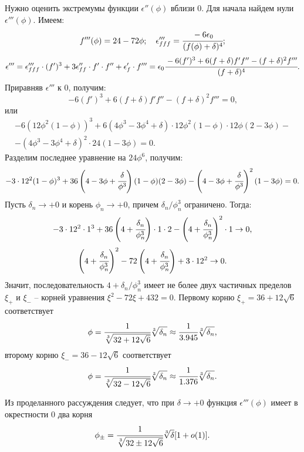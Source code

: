 \documentclass[a4paper,12pt]{article}
\theoremstyle{plain}
\theoremstyle{definition}
\begin{document}
Нужно оценить экстремумы функции $\epsilon''(\phi)$ вблизи $0$. Для начала найдем нули $\epsilon'''(\phi)$. Имеем:
$$f'''(\phi) = 24 - 72 \phi; \quad \epsilon'''_{fff} = \cfrac{-6 \epsilon_0}{(f(\phi) + \delta)^4} \text{;}$$
\begin{equation}
    \epsilon''' = \epsilon'''_{fff} \cdot (f')^3 + 3 \epsilon''_{ff} \cdot f' \cdot f'' + \epsilon'_f \cdot f''' = \epsilon_0 \cfrac{-6 (f')^3 + 6 (f + \delta) f' f'' - (f + \delta)^2 f'''}{(f + \delta)^4} \text{.}
    \label{equation_epsilon_phi_phi_phi}
\end{equation}
Приравняв $\epsilon'''$ к $0$, получим:
$$-6 (f')^3 + 6 (f + \delta) f' f'' - (f + \delta)^2 f''' = 0 \text{,}$$
или
\begin{multline*}
    -6(12 \phi^2 (1 - \phi))^3 + 6(4 \phi^3 - 3\phi^4 + \delta) \cdot 12 \phi^2 (1 - \phi) \cdot 12 \phi (2 - 3\phi) - \\ - (4 \phi^3 - 3 \phi^4 + \delta)^2 \cdot 24 (1 - 3 \phi) = 0 \text{.}
\end{multline*}
Разделим последнее уравнение на $24\phi^6$, получим:
$$-3 \cdot 12^2 (1 - \phi)^3 + 36 \left(4 - 3\phi + \cfrac{\delta}{\phi^3} \right)(1 - \phi)(2 - 3\phi) - \left(4 - 3 \phi + \cfrac{\delta}{\phi^3} \right)^2 (1 - 3 \phi) = 0 \text{.}$$
Пусть $\delta_n \to +0$ и корень $\phi_n \to +0$, причем $\delta_n/\phi_n^3$ ограничено. Тогда:
$$-3 \cdot 12^2 \cdot 1^3 + 36 \left(4 + \cfrac{\delta_n}{\phi_n^3} \right) \cdot 1 \cdot 2 - \left(4 + \cfrac{\delta_n}{\phi_n^3} \right)^2 \cdot 1 \to 0 \text{,}$$
$$\left(4 + \cfrac{\delta_n}{\phi_n^3} \right)^2 - 72 \left(4 + \cfrac{\delta_n}{\phi_n^3} \right) + 3 \cdot 12^2 \to 0 \text{.}$$
Значит, последовательность $4 + \delta_n/\phi_n^3$ имеет не более двух частичных пределов $\xi_+$ и $\xi_-$ -- корней уравнения $\xi^2 - 72 \xi + 432 = 0$. Первому корню $\xi_+ = 36 + 12 \sqrt{6}$ соответствует
$$\phi = \cfrac{1}{\sqrt[3]{32 + 12 \sqrt{6}}} \sqrt[3]{\delta_n} \approx \cfrac{1}{3.945} \sqrt[3]{\delta_n} \text{,}$$
второму корню $\xi_- = 36 - 12 \sqrt{6}$ соответствует
$$\phi = \cfrac{1}{\sqrt[3]{32 - 12 \sqrt{6}}} \sqrt[3]{\delta_n} \approx \cfrac{1}{1.376} \sqrt[3]{\delta_n} \text{.}$$

Из проделанного рассуждения следует, что при $\delta \to +0$ функция $\epsilon'''(\phi)$ имеет в окрестности $0$ два корня
\begin{equation}
    \phi_{\pm} = \cfrac{1}{\sqrt[3]{32 \pm 12 \sqrt{6}}} \sqrt[3]{\delta} [1 + o(1)] \text{.}
    \label{equation_epsilon_phi_phi_phi_roots}
\end{equation}
\end{document}
